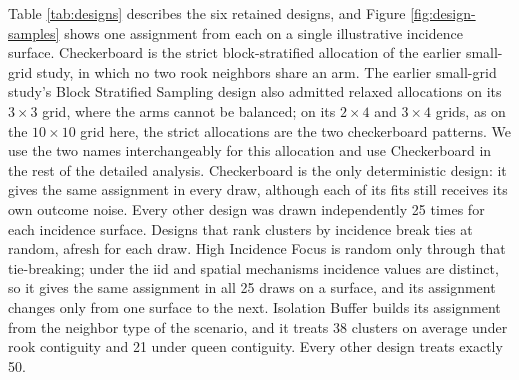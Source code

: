 \documentclass[11pt]{article}
\begin{document}
Table \ref{tab:designs} describes the six retained designs, and Figure
\ref{fig:design-samples} shows one assignment from each on a single
illustrative incidence surface. Checkerboard is the strict
block-stratified allocation of the earlier small-grid study, in which no
two rook neighbors share an arm. The earlier small-grid study's Block
Stratified Sampling design also admitted relaxed allocations on its
\(3\times3\) grid, where the arms cannot be balanced; on its
\(2\times4\) and \(3\times4\) grids, as on the \(10\times10\) grid here,
the strict allocations are the two checkerboard patterns. We use the two
names interchangeably for this allocation and use Checkerboard in the
rest of the detailed analysis. Checkerboard is the only deterministic
design: it gives the same assignment in every draw, although each of its
fits still receives its own outcome noise. Every other design was drawn
independently 25 times for each incidence surface. Designs that rank
clusters by incidence break ties at random, afresh for each draw. High
Incidence Focus is random only through that tie-breaking; under the iid
and spatial mechanisms incidence values are distinct, so it gives the
same assignment in all 25 draws on a surface, and its assignment changes
only from one surface to the next. Isolation Buffer builds its
assignment from the neighbor type of the scenario, and it treats 38
clusters on average under rook contiguity and 21 under queen contiguity.
Every other design treats exactly 50.
\end{document}
